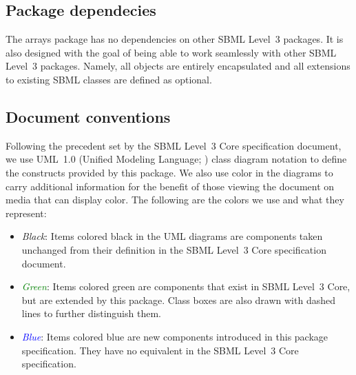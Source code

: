 
\subsection{Package dependecies}

The arrays package has no dependencies on other SBML Level~3 packages.  It is also designed with the goal of being able to work seamlessly with other SBML Level~3 packages.  Namely, all objects are entirely encapsulated and all extensions to existing SBML classes are defined as optional.

\subsection{Document conventions}
\label{conventions}

Following the precedent set by the SBML Level~3 Core specification
document, we use UML~1.0 (Unified Modeling Language;
\citealt{eriksson:1998,oestereich:1999}) class diagram notation to
define the constructs provided by this package.  We also use color in
the diagrams to carry additional information for the benefit of those
viewing the document on media that can display color.  The following are
the colors we use and what they represent:

\begin{itemize}

\item[\raisebox{2.75pt}{\colorbox{black}{\rule{0.8pt}{0.8pt}}}]
  \emph{Black}: Items colored black in the UML diagrams are components
  taken unchanged from their definition in the SBML Level~3 Core
  specification document.

\item[\raisebox{2.75pt}{\colorbox{green}{\rule{0.8pt}{0.8pt}}}]
  \emph{\textcolor{green}{Green}}: Items colored green are
  components that exist in SBML Level~3 Core, but are extended by this
  package.  Class boxes are also drawn with dashed lines to further
  distinguish them.

\item[\raisebox{2.75pt}{\colorbox{blue}{\rule{0.8pt}{0.8pt}}}]
  \emph{\textcolor{blue}{Blue}}: Items colored blue are new
  components introduced in this package specification.  They have no
  equivalent in the SBML Level~3 Core specification.

\end{itemize}

